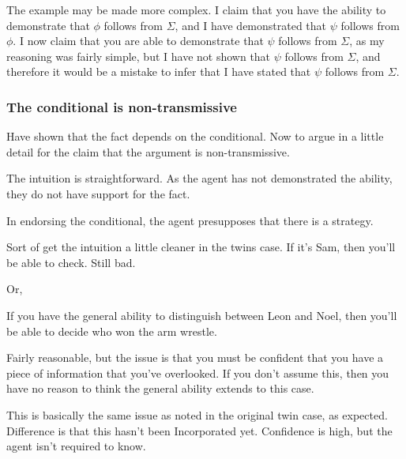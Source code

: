 \documentclass[10pt]{article}
\begin{document}
\begin{note}
  \begin{enumerate*}[label=(\roman*)]
  \item The example may be made more complex.
    I claim that you have the ability to demonstrate that \(\phi\) follows from \(\Sigma\), and I have demonstrated that \(\psi\) follows from \(\phi\).
    I now claim that you are able to demonstrate that \(\psi\) follows from \(\Sigma\), as my reasoning was fairly simple, but I have not shown that \(\psi\) follows from \(\Sigma\), and therefore it would be a mistake to infer that I have stated that \(\psi\) follows from \(\Sigma\).
  \end{enumerate*}
\end{note}

\newpage

\subsubsection{The conditional is non-transmissive}
\label{sec:argum-non-transm}

\begin{note}[Overview]
  Have shown that the fact depends on the conditional.
  Now to argue in a little detail for the claim that the argument is non-transmissive.
\end{note}

The intuition is straightforward.
As the agent has not demonstrated the ability, they do not have support for the fact.

In endorsing the conditional, the agent presupposes that there is a strategy.

Sort of get the intuition a little cleaner in the twins case.
If it's Sam, then you'll be able to check.
Still bad.

Or,

If you have the general ability to distinguish between Leon and Noel, then you'll be able to decide who won the arm wrestle.

Fairly reasonable, but the issue is that you must be confident that you have a piece of information that you've overlooked.
If you don't assume this, then you have no reason to think the general ability extends to this case.

This is basically the same issue as noted in the original twin case, as expected.
{
  \color{red}
  Difference is that this hasn't been Incorporated yet.
  Confidence is high, but the agent isn't required to know.
}
\end{document}

